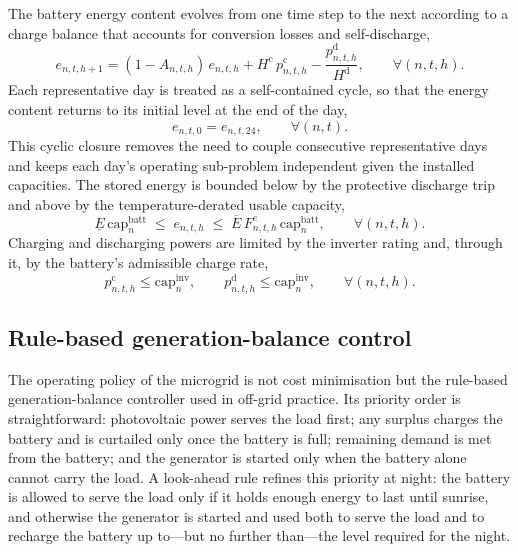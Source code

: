 \documentclass[11pt,a4paper]{article}
\theoremstyle{plain}
\theoremstyle{definition}
\begin{document}
The battery energy content evolves from one time step to the next according to a charge
balance that accounts for conversion losses and self-discharge,
\begin{equation}
  e_{n,t,h+1} = (1-A_{n,t,h})\,e_{n,t,h}
  + H^{\mathrm{c}}\,p^{\mathrm{c}}_{n,t,h}
  - \frac{p^{\mathrm{d}}_{n,t,h}}{H^{\mathrm{d}}},
  \qquad \forall (n,t,h).
  \label{eq:soc-dynamics}
\end{equation}
Each representative day is treated as a self-contained cycle, so that the energy content
returns to its initial level at the end of the day,
\begin{equation}
  e_{n,t,0} = e_{n,t,24},
  \qquad \forall (n,t).
  \label{eq:soc-cyclic}
\end{equation}
This cyclic closure removes the need to couple consecutive representative days and keeps
each day's operating sub-problem independent given the installed capacities. The stored
energy is bounded below by the protective discharge trip and above by the
temperature-derated usable capacity,
\begin{equation}
  \underline{E}\,\mathrm{cap}^{\mathrm{batt}}_n
  \;\leq\; e_{n,t,h} \;\leq\;
  \overline{E}\, F^{e}_{n,t,h}\,\mathrm{cap}^{\mathrm{batt}}_n,
  \qquad \forall (n,t,h).
  \label{eq:soc-bounds}
\end{equation}
Charging and discharging powers are limited by the inverter rating and, through it, by
the battery's admissible charge rate,
\begin{equation}
  p^{\mathrm{c}}_{n,t,h} \leq \mathrm{cap}^{\mathrm{inv}}_n,
  \qquad
  p^{\mathrm{d}}_{n,t,h} \leq \mathrm{cap}^{\mathrm{inv}}_n,
  \qquad \forall (n,t,h).
  \label{eq:inv-bounds}
\end{equation}

\subsection{Rule-based generation-balance control}
\label{sec:dispatch}

The operating policy of the microgrid is not cost minimisation but the rule-based
generation-balance controller used in off-grid practice. Its priority order is
straightforward: photovoltaic power serves the load first; any surplus charges the
battery and is curtailed only once the battery is full; remaining demand is met from the
battery; and the generator is started only when the battery alone cannot carry the load.
A look-ahead rule refines this priority at night: the battery is allowed to serve the
load only if it holds enough energy to last until sunrise, and otherwise the generator is
started and used both to serve the load and to recharge the battery up to---but no
further than---the level required for the night.
\end{document}
